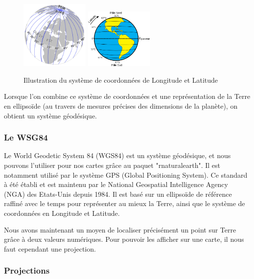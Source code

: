 \documentclass{article}
\begin{document}
\begin{figure}[H]
    \centering
    \includegraphics[width=0.3\textwidth]{Ressources/Cartographie/Longitude.png}
    \includegraphics[width=0.3\textwidth]{Ressources/Cartographie/Latitude.png}
    \caption{Illustration du système de coordonnées de Longitude et Latitude}
\end{figure}

Lorsque l'on combine ce système de coordonnées et une représentation de la Terre en ellipsoïde (au travers de mesures précises des dimensions de la planète), on obtient un système géodésique.

\subsubsection{Le WSG84}

Le World Geodetic System 84 (WGS84) est un système géodésique, et nous pouvons l'utiliser pour nos cartes grâce au paquet "rnaturalearth". Il est notamment utilisé par le système GPS (Global Positioning System). Ce standard à été établi et est maintenu par le National Geospatial Intelligence Agency (NGA) des Etats-Unis \cite{enwiki:1065796786} depuis 1984. Il est basé sur un ellipsoïde de référence raffiné avec le temps pour représenter au mieux la Terre, ainsi que le système de coordonnées en Longitude et Latitude.

Nous avons maintenant un moyen de localiser précisément un point sur Terre grâce à deux valeurs numériques. Pour pouvoir les afficher sur une carte, il nous faut cependant une projection.

\subsubsection{Projections}
\end{document}
